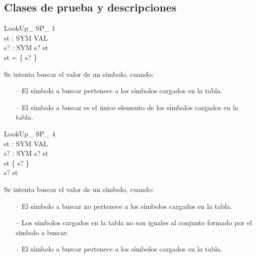 \subsection*{Clases de prueba y descripciones}

\begin{schema}{LookUp\_ SP\_ 1}\\
 st : SYM \pfun VAL \\
 s? : SYM 
\where
 s? \in \dom st \\
 \dom st = \{ s? \}
\end{schema}

\begin{tcolorbox}[colback=gray!5!white,colframe=gray!50!black,
  colbacktitle=gray!75!black,title=LookUp\_ SP\_ 1]
  Se intenta buscar el valor de un símbolo, cuando:
     \begin{itemize}
        \item[--]{El símbolo a buscar pertenece a los símbolos cargados en la tabla.}
        \item[--]{El símbolo a buscar es el único elemento de los símbolos cargados en la tabla.}
     \end{itemize}
\end{tcolorbox}

\begin{schema}{LookUp\_ SP\_ 4}\\
 st : SYM \pfun VAL \\
 s? : SYM 
\where
 s? \notin \dom st \\
 \dom st \neq \{ s? \} \\
 s? \in \dom st
\end{schema}

\begin{tcolorbox}[colback=gray!5!white,colframe=gray!50!black,
  colbacktitle=gray!75!black,title=LookUp\_ SP\_ 4]
  Se intenta buscar el valor de un símbolo, cuando:
     \begin{itemize}
        \item[--]{El símbolo a buscar no pertenece a los símbolos cargados en la tabla.}
        \item[--]{Los símbolos cargados en la tabla no son iguales al conjunto formado por el símbolo a buscar.}
        \item[--]{El símbolo a buscar pertenece a los símbolos cargados en la tabla.}
     \end{itemize}
\end{tcolorbox}


